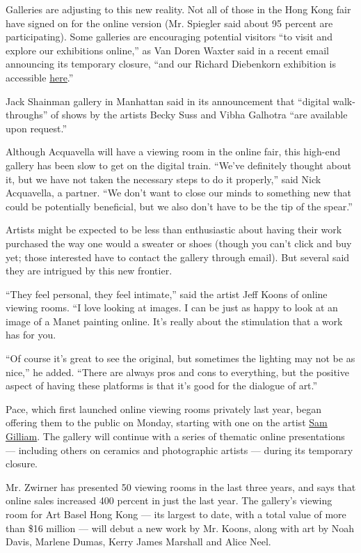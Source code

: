 Galleries are adjusting to this new reality. Not all of those in the
Hong Kong fair have signed on for the online version (Mr. Spiegler said
about 95 percent are participating). Some galleries are encouraging
potential visitors ``to visit and explore our exhibitions online,'' as
Van Doren Waxter said in a recent email announcing its temporary
closure, ``and our Richard Diebenkorn exhibition is accessible
\href{https://vandorenwaxter.us7.list-manage.com/track/click?u=0a81893ab01d673c4dd8101cd\&id=d24833bbd3\&e=651860936b}{here}.''

Jack Shainman gallery in Manhattan said in its announcement that
``digital walk-throughs'' of shows by the artists Becky Suss and Vibha
Galhotra ``are available upon request.''

Although Acquavella will have a viewing room in the online fair, this
high-end gallery has been slow to get on the digital train. ``We've
definitely thought about it, but we have not taken the necessary steps
to do it properly,'' said Nick Acquavella, a partner. ``We don't want to
close our minds to something new that could be potentially beneficial,
but we also don't have to be the tip of the spear.''

Artists might be expected to be less than enthusiastic about having
their work purchased the way one would a sweater or shoes (though you
can't click and buy yet; those interested have to contact the gallery
through email). But several said they are intrigued by this new
frontier.

``They feel personal, they feel intimate,'' said the artist Jeff Koons
of online viewing rooms. ``I love looking at images. I can be just as
happy to look at an image of a Manet painting online. It's really about
the stimulation that a work has for you.

``Of course it's great to see the original, but sometimes the lighting
may not be as nice,'' he added. ``There are always pros and cons to
everything, but the positive aspect of having these platforms is that
it's good for the dialogue of art.''

Pace, which first launched online viewing rooms privately last year,
began offering them to the public on Monday, starting with one on the
artist \href{https://www.pacegallery.com/viewing-rooms/sam-gilliam/}{Sam
Gilliam}. The gallery will continue with a series of thematic online
presentations --- including others on ceramics and photographic artists
--- during its temporary closure.

Mr. Zwirner has presented 50 viewing rooms in the last three years, and
says that online sales increased 400 percent in just the last year. The
gallery's viewing room for Art Basel Hong Kong --- its largest to date,
with a total value of more than \$16 million --- will debut a new work
by Mr. Koons, along with art by Noah Davis, Marlene Dumas, Kerry James
Marshall and Alice Neel.

